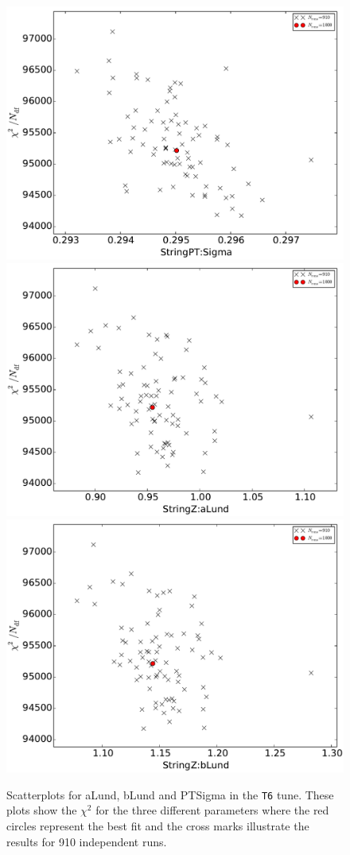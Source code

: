 \documentclass[aps,preprint,floatfix,nofootinbib,showpacs]{revtex4-1}
\begin{document}
\begin{figure}[tbp]
 \centering
 \includegraphics[width=0.35\linewidth]{Figures/RS/Set6/chi2_StringPT_Sigma.pdf}
 \hfill
 \includegraphics[width=0.35\linewidth]{Figures/RS/Set6/chi2_StringZ_aLund.pdf}
 \hfill
 \includegraphics[width=0.35\linewidth]{Figures/RS/Set6/chi2_StringZ_bLund.pdf}
 \caption{Scatterplots for \textsf{aLund}, \textsf{bLund} and \textsf{PTSigma} in
 the \texttt{T6} tune. These plots show the $\chi^2$ for the three different 
 parameters where the red circles represent the best fit and the cross marks illustrate 
 the results for 910 independent runs.}
 \label{RS.2}
\end{figure}
\end{document}
